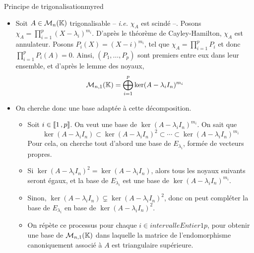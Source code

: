     \begin{omed}{Principe de trigonalisation}{myred}
        \begin{itemize}
            \item Soit $A \in \mathcal{M}_{n}(\mathbb{K})$ trigonalisable -- \textit{i.e.} $\chi_A$ est scindé --. Posons $\chi_A = \prod_{i=1}^{p} (X - \lambda_i)^{m_i}$. D’après le théorème de Cayley-Hamilton, $\chi_A$ est annulateur. Posons $P_i(X) = (X - i)^{m_i}$, tel que $\chi_A = \prod_{i=1}^{p} P_i$ et donc $\prod_{i=1}^{p} P_i(A) = 0$. Ainsi, $(P_1,\ldots,P_p)$ sont premiers entre eux dans leur ensemble, et d’après le lemme des noyaux, 
        \[ \mathcal{M}_{n,1}(\mathbb{K}) = \bigoplus_{i=1}^p \ker(A - \lambda_i I_n)^{m_i} \]   
            \item On cherche donc une base adaptée à cette décomposition. 
            \begin{itemize}
                \item Soit $i \in \left\llbracket 1 \, , p \right\rrbracket$. On veut une base de $\ker(A - \lambda_i I_n)^{m_i}$. On sait que 
                \[ \ker(A - \lambda_i I_n) \subset \ker(A - \lambda_i I_n)^2 \subset \cdots \subset \ker(A -\lambda_i I_n)^{m_i} \]
                Pour cela, on cherche tout d’abord une base de $E_{\lambda_i}$, formée de vecteurs propres.
                \item Si $\ker(A - \lambda_i I_n)^2 = \ker(A - \lambda_i I_n)$, alors tous les noyaux suivants seront égaux, et la base de $E_{\lambda_i}$ est une base de $\ker(A - \lambda_i I_n)^{m_i}$.
                \item Sinon, $\ker(A - \lambda_i I_n) \subsetneq \ker(A - \lambda_i I_n)^2$, donc on peut compléter la base de $E_{\lambda_i}$ en base de $\ker(A - \lambda_i I_n)^2$.
                \item On répète ce processus pour chaque $i \in intervalleEntier{1}{p}$, pour obtenir une base de $\mathcal{M}_{n,1}(\mathbb{K})$ dans laquelle la matrice de l’endomorphisme canoniquement associé à $A$ est triangulaire supérieure.
            \end{itemize}
        \end{itemize}
    \end{omed}

